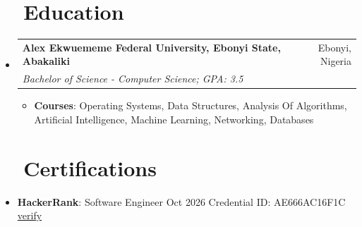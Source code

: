 \documentclass[a4paper, 20pt]{article}
\makeatletter
\newcommand{\resumeItem}[2]{ \item\small{ \textbf{#1}{: #2} } }
\newcommand{\resumeSubheading}[4]{
\vspace{-1pt}
\item[]
\begin{tabular*}{0.97\textwidth}{l@{\extracolsep{\fill}}r}
	\textbf{#1} & #2          \\
	\textit{#3} & \textit{#4} \\
\end{tabular*}
\vspace{1pt}
}
\newcommand{\resumeSubItem}[2]{\resumeItem{#1}{#2}
\vspace{-8pt}}
\newcommand{\resumeSubHeadingListStart}{\begin{itemize}[leftmargin=*,topsep=1pt]}
\newcommand{\resumeSubHeadingListEnd}{\end{itemize}}
\newcommand{\resumeItemListStart}{\begin{itemize}[topsep=0pt,itemsep=0pt,parsep=0pt]}
\newcommand{\resumeItemListEnd}{\end{itemize}}
\makeatother
\begin{document}



	\vspace{-5pt}
	\section{~~Education}
	\resumeSubHeadingListStart \resumeSubheading {Alex Ekwuememe Federal University, Ebonyi State, Abakaliki}{Ebonyi, Nigeria}
	{Bachelor of Science - Computer Science; GPA: 3.5}{} \resumeItemListStart \resumeItem{Courses}{Operating Systems, Data Structures, Analysis Of Algorithms, Artificial Intelligence, Machine Learning, Networking, Databases}
	\resumeItemListEnd \resumeSubHeadingListEnd

	\vspace{8pt}
	\section{~~Certifications}
	\resumeSubHeadingListStart \resumeSubItem{HackerRank}{Software Engineer \textbullet{} Oct 2026 \textbullet{} Credential ID: AE666AC16F1C \textbullet{} \href{https://www.hackerrank.com/certificates/e4382188f72a}{verify}}
	\resumeSubHeadingListEnd
\end{document}
